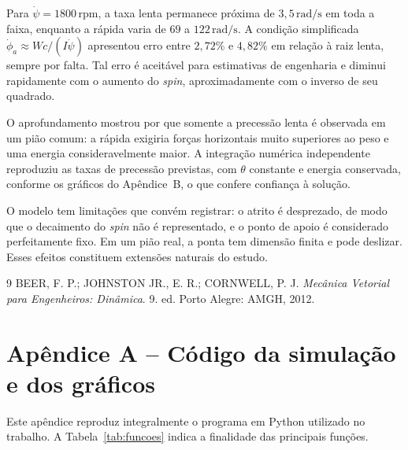 \documentclass[12pt,a4paper]{article}
\newcommand{\un}[1]{\,\mathrm{#1}}
\newcommand{\phid}{\dot{\phi}}
\newcommand{\psid}{\dot{\psi}}
\begin{document}
Para $\psid=1800\un{rpm}$, a taxa lenta permanece próxima de $3,5\un{rad/s}$ em toda a faixa, enquanto a rápida varia de $69$ a $122\un{rad/s}$. A condição simplificada $\phid_a\approx Wc/(I\psid)$ apresentou erro entre $2,72\%$ e $4,82\%$ em relação à raiz lenta, sempre por falta. Tal erro é aceitável para estimativas de engenharia e diminui rapidamente com o aumento do \textit{spin}, aproximadamente com o inverso de seu quadrado.

O aprofundamento mostrou por que somente a precessão lenta é observada em um pião comum: a rápida exigiria forças horizontais muito superiores ao peso e uma energia consideravelmente maior. A integração numérica independente reproduziu as taxas de precessão previstas, com $\theta$ constante e energia conservada, conforme os gráficos do Apêndice~B, o que confere confiança à solução.

O modelo tem limitações que convém registrar: o atrito é desprezado, de modo que o decaimento do \textit{spin} não é representado, e o ponto de apoio é considerado perfeitamente fixo. Em um pião real, a ponta tem dimensão finita e pode deslizar. Esses efeitos constituem extensões naturais do estudo.

\clearpage
{}
{}
\begin{thebibliography}{9}
BEER, F. P.; JOHNSTON JR., E. R.; CORNWELL, P. J. \textit{Mecânica Vetorial para Engenheiros: Dinâmica}. 9. ed. Porto Alegre: AMGH, 2012.

\end{thebibliography}

\clearpage
{}
{}
\section*{Apêndice A -- Código da simulação e dos gráficos}

Este apêndice reproduz integralmente o programa em Python utilizado no trabalho. A Tabela~\ref{tab:funcoes} indica a finalidade das principais funções.
\end{document}
